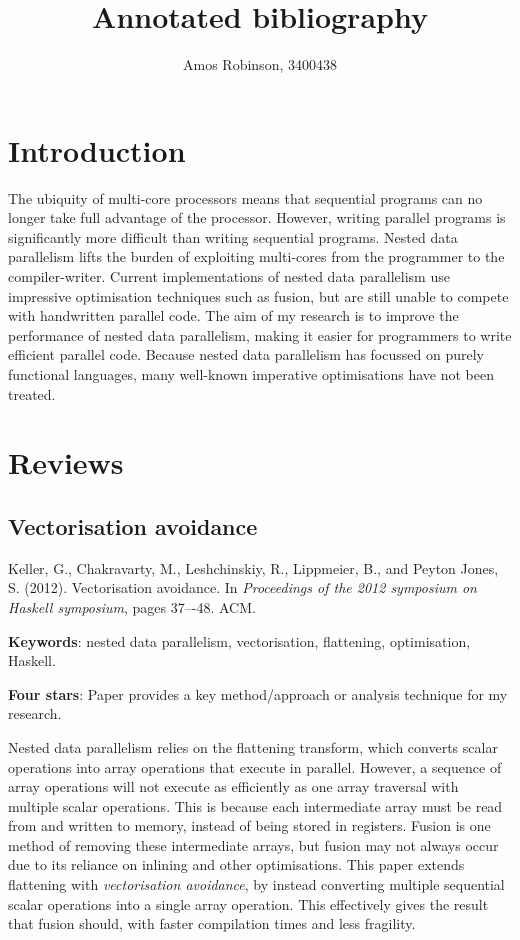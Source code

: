 \documentclass[12pt,a4paper]{article}
\author{Amos Robinson, 3400438}
\title{Annotated bibliography}
\begin{document}
\maketitle
\thispagestyle{myheadings}

\onehalfspacing

\section{Introduction}
The ubiquity of multi-core processors means that sequential programs can no longer take full advantage of the processor.
However, writing parallel programs is significantly more difficult than writing sequential programs.
Nested data parallelism lifts the burden of exploiting multi-cores from the programmer to the compiler-writer.
Current implementations of nested data parallelism use impressive optimisation techniques such as fusion, but are still unable to compete with handwritten parallel code.
The aim of my research is to improve the performance of nested data parallelism, making it easier for programmers to write efficient parallel code.
Because nested data parallelism has focussed on purely functional languages, many well-known imperative optimisations have not been treated. 

\pagebreak

\section{Reviews}

\subsection{Vectorisation avoidance}
\cite{keller2012vectorisation}
Keller, G., Chakravarty, M., Leshchinskiy, R., Lippmeier, B., and Peyton Jones, S. (2012). Vectorisation avoidance. In \emph{Proceedings of the 2012 symposium on Haskell symposium}, pages 37–-48. ACM.

{\bf Keywords}: nested data parallelism, vectorisation, flattening, optimisation, Haskell.

{\bf Four stars}: Paper provides a key method/approach or analysis technique for my research.

Nested data parallelism relies on the flattening transform, which converts scalar operations into array operations that execute in parallel.
However, a sequence of array operations will not execute as efficiently as one array traversal with multiple scalar operations.
This is because each intermediate array must be read from and written to memory, instead of being stored in registers.
Fusion is one method of removing these intermediate arrays, but fusion may not always occur due to its reliance on inlining and other optimisations. 
This paper extends flattening with \emph{vectorisation avoidance}, by instead converting multiple sequential scalar operations into a single array operation.
This effectively gives the result that fusion should, with faster compilation times and less fragility.
\end{document}
